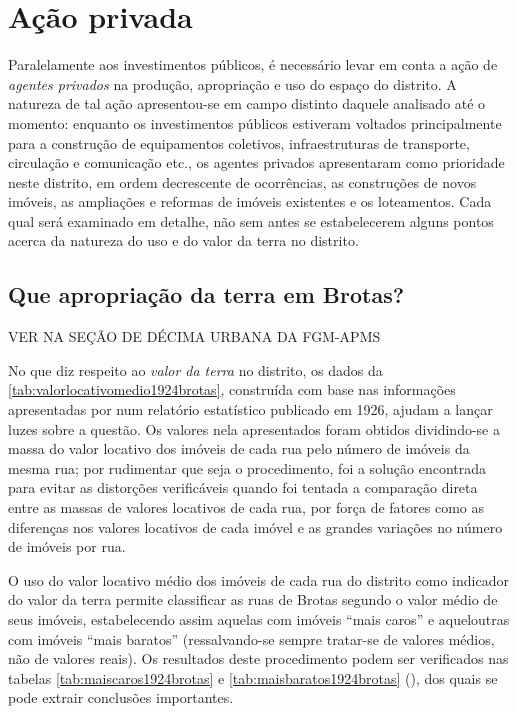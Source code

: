 \section{Ação privada}\label{sec:acaoprivada}

Paralelamente aos investimentos públicos, é necessário levar em conta a ação de \textit{agentes privados} na produção, apropriação e uso do espaço do distrito. A natureza de tal ação apresentou-se em campo distinto daquele analisado até o momento: enquanto os investimentos públicos estiveram voltados principalmente para a construção de equipamentos coletivos, infraestruturas de transporte, circulação e comunicação etc., os agentes privados apresentaram como prioridade neste distrito, em ordem decrescente de ocorrências, as construções de novos imóveis, as ampliações e reformas de imóveis existentes e os loteamentos. Cada qual será examinado em detalhe, não sem antes se estabelecerem alguns pontos acerca da natureza do uso e do valor da terra no distrito.

\subsection{Que apropriação da terra em Brotas?}\label{subsec:apropribrotas}

VER NA SEÇÃO DE DÉCIMA URBANA DA FGM-APMS




No que diz respeito ao \textit{valor da terra} no distrito, os dados da \autoref{tab:valorlocativomedio1924brotas}, construída com base nas informações apresentadas por  num relatório estatístico publicado em 1926, ajudam a lançar luzes sobre a questão. Os valores nela apresentados foram obtidos dividindo-se a massa do valor locativo dos imóveis de cada rua pelo número de imóveis da mesma rua; por rudimentar que seja o procedimento, foi a solução encontrada para evitar as distorções verificáveis quando foi tentada a comparação direta entre as massas de valores locativos de cada rua, por força de fatores como as diferenças nos valores locativos de cada imóvel e as grandes variações no número de imóveis por rua.



O uso do valor locativo médio dos imóveis de cada rua do distrito como indicador do valor da terra permite classificar as ruas de Brotas segundo o valor médio de seus imóveis, estabelecendo assim aquelas com imóveis ``mais caros'' e aqueloutras com imóveis ``mais baratos'' (ressalvando-se sempre tratar-se de valores médios, não de valores reais). Os resultados deste procedimento podem ser verificados nas tabelas \autoref{tab:maiscaros1924brotas} e \autoref{tab:maisbaratos1924brotas} (\pageref{tab:maisbaratos1924brotas}), dos quais se pode extrair conclusões importantes.

